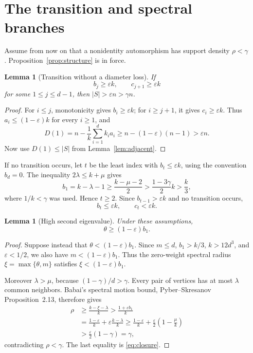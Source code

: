 \documentclass[11pt]{amsart}
\newtheorem{lemma}[theorem]{Lemma}
\theoremstyle{definition}
\newcommand{\eps}{\varepsilon}
\newcommand{\gam}{\gamma}
\begin{document}
\section{The transition and spectral branches}
Assume from now on that a nonidentity automorphism has support density $\rho<\gam$.  Proposition~\ref{prop:structure} is in force.

\begin{lemma}[Transition without a diameter loss]\label{lem:transition}
If
\[
  b_j\ge\eps k,
  \qquad
  c_{j+1}\ge\eps k
\]
for some $1\le j\le d-1$, then $|S|>\eps n>\gam n$.
\end{lemma}

\begin{proof}
For $i\le j$, monotonicity gives $b_i\ge\eps k$; for $i\ge j+1$, it gives $c_i\ge\eps k$.  Thus $a_i\le(1-\eps)k$ for every $i\ge1$, and
\[
  D(1)=n-\frac1k\sum_{i=1}^{d}k_i a_i
  \ge n-(1-\eps)(n-1)>\eps n.
\]
Now use $D(1)\le|S|$ from Lemma~\ref{lem:adjacent}.
\end{proof}

If no transition occurs, let $t$ be the least index with $b_t\le\eps k$, using the convention $b_d=0$.  The inequality $2\lambda\le k+\mu$ gives
\[
  b_1=k-\lambda-1\ge\frac{k-\mu-2}{2}
  >\frac{1-3\gam}{2}k>\frac{k}{3},
\]
where $1/k<\gam$ was used.  Hence $t\ge2$.  Since $b_{t-1}>\eps k$ and no transition occurs,
\begin{equation}\label{eq:smallbtct}
  b_t\le\eps k,
  \qquad
  c_t<\eps k.
\end{equation}

\begin{lemma}[High second eigenvalue]\label{lem:hightheta}
Under these assumptions,
\begin{equation}\label{eq:hightheta}
  \theta\ge(1-\eps)b_1.
\end{equation}
\end{lemma}

\begin{proof}
Suppose instead that $\theta<(1-\eps)b_1$.  Since $m\le d$, $b_1>k/3$, $k>12d^3$, and $\eps<1/2$, we also have $m<(1-\eps)b_1$.  Thus the zero-weight spectral radius $\xi=\max\{\theta,m\}$ satisfies $\xi<(1-\eps)b_1$.

Moreover $\lambda>\mu$, because $(1-\gam)/d>\gam$.  Every pair of vertices has at most $\lambda$ common neighbors.  Babai's spectral motion bound, Pyber--Skresanov Proposition~2.13, therefore gives
\begin{align*}
 \rho
 &\ge\frac{k-\xi-\lambda}{k}
 >\frac{1+\eps b_1}{k}\\
 &=\frac{1-\eps}{k}+\eps\frac{k-\lambda}{k}
 \ge\frac{1-\eps}{k}+\frac\eps2\left(1-\frac\mu k\right)\\
 &>\frac\eps2(1-\gam)=\gam,
\end{align*}
contradicting $\rho<\gam$.  The last equality is \eqref{eq:closure}.
\end{proof}
\end{document}
